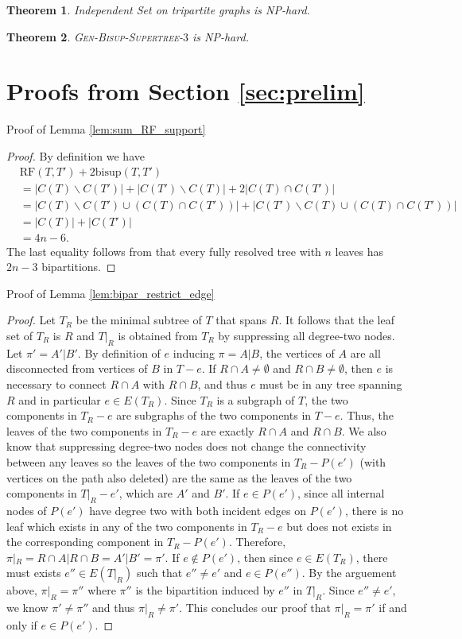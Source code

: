 \documentclass{bmcart}
\newcommand{\bs}{\mathrm{bisup}}
\newcommand{\RF}{\mathrm{RF}}
\newcommand{\genbisupthree}{\textsc{Gen-Bisup-Supertree-$3$}\xspace}
\newtheorem{theorem}{Theorem}
\begin{document}
\begin{theorem}\label{thm:IS_tripartite_hardness}
Independent Set on tripartite graphs is NP-hard.
\end{theorem}

\begin{theorem}\label{thm:hardness}
\genbisupthree is NP-hard.
\end{theorem}


\appendix
\section{Proofs from Section \ref{sec:prelim}}

Proof of Lemma \ref{lem:sum_RF_support}
\begin{proof}
By definition we have 
  \begin{align*}
    &\RF(T,T')+2\bs(T,T') \\ &= |C(T)\backslash C(T')| + |C(T') \backslash C(T)| + 2|C(T) \cap C(T')| \\
    &= |C(T)\backslash C(T') \cup (C(T) \cap C(T'))| + |C(T') \backslash C(T) \cup (C(T) \cap C(T'))|\\
    &= |C(T)| + |C(T')|\\
    &= 4n-6.
  \end{align*}
  The last equality follows from that every fully resolved tree with $n$ leaves has $2n-3$ bipartitions.
\end{proof}

Proof of Lemma \ref{lem:bipar_restrict_edge}
\begin{proof}
Let $T_R$ be the minimal subtree of $T$ that spans $R$. It follows that the leaf set of $T_R$ is $R$ and $T|_R$ is obtained from $T_R$ by suppressing all degree-two nodes. Let $\pi' = A'|B'$.
By definition of $e$ inducing $\pi = A|B$, the vertices of $A$ are all disconnected from vertices of $B$ in $T-e$. If $R\cap A \neq \emptyset$ and $R\cap B \neq \emptyset$, then $e$ is necessary to connect $R\cap A$ with $R \cap B$, and thus $e$ must be in any tree spanning $R$ and in particular $e \in E(T_R)$. Since $T_R$ is a subgraph of $T$, the two components in $T_R-e$ are subgraphs of the two components in $T-e$. Thus, the leaves of the two components in $T_R-e$ are exactly $R\cap A$ and $R\cap B$. We also know that suppressing degree-two nodes does not change the connectivity between any leaves so the leaves of the two components in $T_R - P(e')$ (with vertices on the path also deleted) are the same as the leaves of the two components in $T|_R - e'$, which are $A'$ and $B'$. If $e \in P(e')$, since all internal nodes of $P(e')$ have degree two with both incident edges on $P(e')$, there is no leaf which exists in any of the two components in $T_R - e$ but does not exists in the corresponding component in $T_R-P(e')$. Therefore, $\pi|_R = R\cap A|R\cap B = A'|B' = \pi'$. If $e \notin P(e')$, then since $e \in E(T_R)$, there must exists $e'' \in E(T|_R)$ such that $e'' \neq e'$ and $e \in P(e'')$. By the arguement above, $\pi|_R = \pi''$ where $\pi''$ is the bipartition induced by $e''$ in $T|_R$. Since $e'' \neq e'$, we know $\pi' \neq \pi''$ and thus $\pi|_R \neq \pi'$. This concludes our proof that $\pi|_R = \pi'$ if and only if $e \in P(e')$. 
\end{proof}
\end{document}
